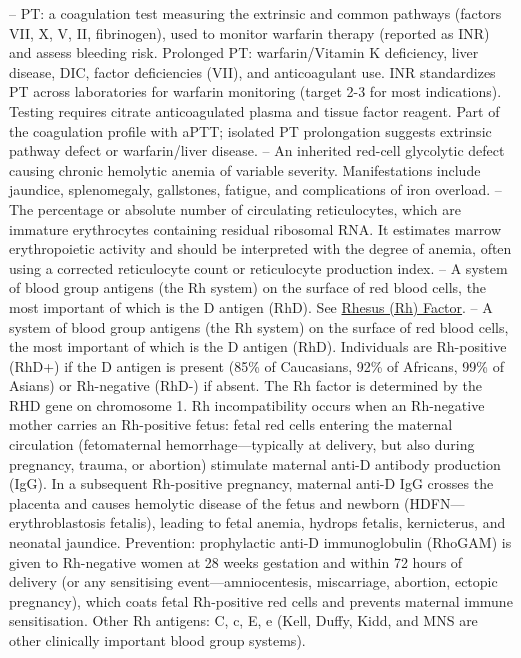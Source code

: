 -- PT: a coagulation test measuring the extrinsic and common pathways (factors VII, X, V, II, fibrinogen), used to monitor warfarin therapy (reported as INR) and assess bleeding risk. Prolonged PT: warfarin/Vitamin K deficiency, liver disease, DIC, factor deficiencies (VII), and anticoagulant use. INR standardizes PT across laboratories for warfarin monitoring (target 2-3 for most indications). Testing requires citrate anticoagulated plasma and tissue factor reagent. Part of the coagulation profile with aPTT; isolated PT prolongation suggests extrinsic pathway defect or warfarin/liver disease.
-- An inherited red-cell glycolytic defect causing chronic hemolytic anemia of variable severity. Manifestations include jaundice, splenomegaly, gallstones, fatigue, and complications of iron overload.
-- The percentage or absolute number of circulating reticulocytes, which are immature erythrocytes containing residual ribosomal RNA. It estimates marrow erythropoietic activity and should be interpreted with the degree of anemia, often using a corrected reticulocyte count or reticulocyte production index.
-- A system of blood group antigens (the Rh system) on the surface of red blood cells, the most important of which is the D antigen (RhD). See \hyperlink{Rhesus (Rh) Factor}{Rhesus (Rh) Factor}.
-- A system of blood group antigens (the Rh system) on the surface of red blood cells, the most important of which is the D antigen (RhD). Individuals are Rh-positive (RhD+) if the D antigen is present (85\% of Caucasians, 92\% of Africans, 99\% of Asians) or Rh-negative (RhD-) if absent. The Rh factor is determined by the RHD gene on chromosome 1. Rh incompatibility occurs when an Rh-negative mother carries an Rh-positive fetus: fetal red cells entering the maternal circulation (fetomaternal hemorrhage—typically at delivery, but also during pregnancy, trauma, or abortion) stimulate maternal anti-D antibody production (IgG). In a subsequent Rh-positive pregnancy, maternal anti-D IgG crosses the placenta and causes hemolytic disease of the fetus and newborn (HDFN—erythroblastosis fetalis), leading to fetal anemia, hydrops fetalis, kernicterus, and neonatal jaundice. Prevention: prophylactic anti-D immunoglobulin (RhoGAM) is given to Rh-negative women at 28 weeks gestation and within 72 hours of delivery (or any sensitising event—amniocentesis, miscarriage, abortion, ectopic pregnancy), which coats fetal Rh-positive red cells and prevents maternal immune sensitisation. Other Rh antigens: C, c, E, e (Kell, Duffy, Kidd, and MNS are other clinically important blood group systems).

